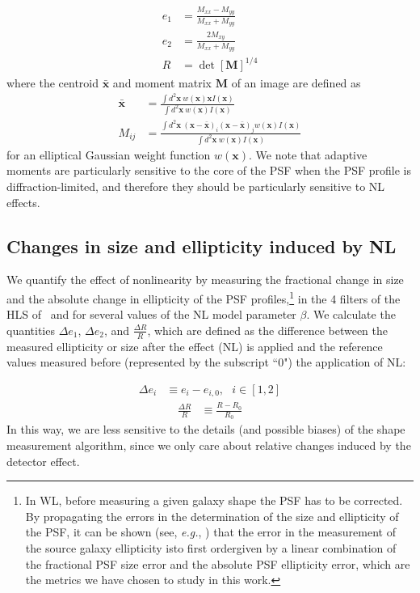 \documentclass[11pt,preprint,flushrt]{aastex}
\begin{document}
\begin{align}
e_1&=\frac{M_{xx} - M_{yy}}{M_{xx}+M_{yy}} \\
e_2&=\frac{2 M_{xy}}{M_{xx}+M_{yy}} \\
R&=\det[\mathbf{M}]^{1/4}
 \end{align}
where the centroid $\mathbf{\bar{x}}$ and moment matrix $\mathbf{M}$ of an image are defined as
\begin{align}
\mathbf{\bar{x}}&=\frac{\int d^2\mathbf{x}\ w(\mathbf{x}) \mathbf{x} I(\mathbf{x})}{\int d^2 \mathbf{x}\ w(\mathbf{x})I(\mathbf{x})} \\
M_{ij}&=\frac{\int d^2\mathbf{x}\ (\mathbf{x} - \mathbf{\bar{x}})_i  (\mathbf{x} - \mathbf{\bar{x}})_j w(\mathbf{x}) I(\mathbf{x})} {\int d^2\mathbf{x}\ w(\mathbf{x})I(\mathbf{x})}
\end{align}
for an elliptical Gaussian weight function $w(\mathbf{x})$. 
We note that adaptive moments are particularly sensitive to the core of the PSF when the PSF profile is diffraction-limited, and therefore they should be particularly sensitive to NL effects.

\subsection{Changes in size and ellipticity induced by NL}

We quantify the effect of nonlinearity by measuring the fractional change in size and the absolute change in ellipticity of the PSF profiles,\footnote{In WL, before measuring a given galaxy shape the PSF has to be corrected. By propagating the errors in the determination of the size and ellipticity of the PSF, it can be shown (see, \emph{e.g.}, \citealt{paulin08}) that the error in the measurement of the source galaxy ellipticity is\textemdash to first order\textemdash given by a linear combination of the fractional PSF size error and the absolute PSF ellipticity error, which are the metrics we have chosen to study in this work.} in the 4 filters of the HLS of \wfa\, and for several values of the NL model parameter $\beta$. We calculate the quantities $\Delta e_1$, $\Delta e_2$, and $\frac{\Delta R}{R}$, which are defined as the difference between the measured ellipticity or size after the effect (NL) is applied and the reference values measured before (represented by the subscript ``$0$") the application of NL:

\begin{align}
\Delta e_{i} &\equiv e_{i} - e_{i,0},\ \ \ i\in[1,2]  
\label{delta_e}
\end{align}
\begin{align}
\frac{\Delta R}{R} &\equiv \frac {{R} - R_{0}}  { R_{0}}
\label{delta_r}
\end{align}
In this way, we are less sensitive to the details (and possible biases) of the shape measurement algorithm, since we only care about relative changes induced by the detector effect. 
\end{document}
